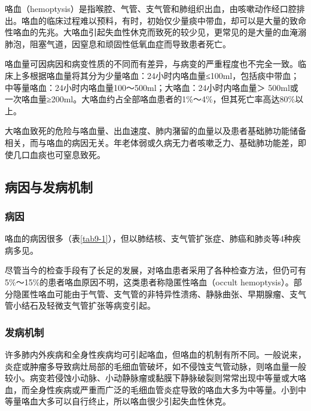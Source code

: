 咯血（hemoptysis）是指喉腔、气管、支气管和肺组织出血，由咳嗽动作经口腔排出。咯血的临床过程难以预料，有时，初始仅少量痰中带血，却可以是大量的致命性咯血的先兆。大咯血引起失血性休克而致死的较少见，更常见的是大量的血淹溺肺泡，阻塞气道，因窒息和顽固性低氧血症而导致患者死亡。

咯血量可因病因和病变性质的不同而有差异，与病变的严重程度也不完全一致。临床上多根据咯血量将其分为少量咯血：24小时内咯血量≤100ml，包括痰中带血；中等量咯血：24小时内咯血量100～500ml；大咯血：24小时内咯血量＞
500ml或一次咯血量≥200ml。大咯血约占全部咯血患者的1\%～4\%，但其死亡率高达80\%以上。

大咯血致死的危险与咯血量、出血速度、肺内潴留的血量以及患者基础肺功能储备相关，而与咯血的病因无关。年老体弱或久病无力者咳嗽乏力、基础肺功能差，即使几口血痰也可窒息致死。

\subsection{病因与发病机制}

\subsubsection{病因}

咯血的病因很多（表\ref{tab9-1}），但以肺结核、支气管扩张症、肺癌和肺炎等4种疾病多见。

尽管当今的检查手段有了长足的发展，对咯血患者采用了各种检查方法，但仍可有5\%～15\%的患者咯血原因不明，这类患者称隐匿性咯血（occult
hemoptysis）。部分隐匿性咯血可能由于气管、支气管的非特异性溃疡、静脉曲张、早期腺瘤、支气管小结石及轻微支气管扩张等病变引起。

\subsubsection{发病机制}

许多肺内外疾病和全身性疾病均可引起咯血，但咯血的机制有所不同。一般说来，炎症或肿瘤多导致病灶局部的毛细血管破坏，如不侵蚀支气管动脉，则咯血量一般较小。病变若侵蚀小动脉、小动静脉瘤或黏膜下静脉破裂则常常出现中等量或大咯血，而全身性疾病或严重而广泛的毛细血管炎症导致的咯血大多为中等量。小到中等量咯血大多可以自行终止，所以咯血很少引起失血性休克。

